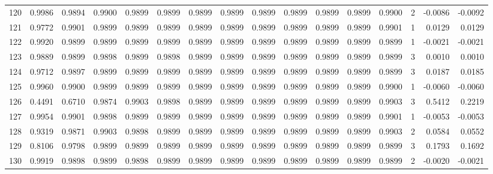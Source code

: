 \begin{tabular}{lrrrrrrrrrrrrrrr}
120 &      0.9986 &  0.9894 &  0.9900 &  0.9899 &  0.9899 &  0.9899 &  0.9899 &  0.9899 &  0.9899 &  0.9899 &   0.9899 &     0.9900 &      2 &                   -0.0086 &                    -0.0092 \\
121 &      0.9772 &  0.9901 &  0.9899 &  0.9899 &  0.9899 &  0.9899 &  0.9899 &  0.9899 &  0.9899 &  0.9899 &   0.9899 &     0.9901 &      1 &                    0.0129 &                     0.0129 \\
122 &      0.9920 &  0.9899 &  0.9899 &  0.9899 &  0.9899 &  0.9899 &  0.9899 &  0.9899 &  0.9899 &  0.9899 &   0.9899 &     0.9899 &      1 &                   -0.0021 &                    -0.0021 \\
123 &      0.9889 &  0.9899 &  0.9898 &  0.9899 &  0.9898 &  0.9899 &  0.9899 &  0.9899 &  0.9899 &  0.9899 &   0.9899 &     0.9899 &      3 &                    0.0010 &                     0.0010 \\
124 &      0.9712 &  0.9897 &  0.9899 &  0.9899 &  0.9899 &  0.9899 &  0.9899 &  0.9899 &  0.9899 &  0.9899 &   0.9899 &     0.9899 &      3 &                    0.0187 &                     0.0185 \\
125 &      0.9960 &  0.9900 &  0.9899 &  0.9899 &  0.9899 &  0.9899 &  0.9899 &  0.9899 &  0.9899 &  0.9899 &   0.9899 &     0.9900 &      1 &                   -0.0060 &                    -0.0060 \\
126 &      0.4491 &  0.6710 &  0.9874 &  0.9903 &  0.9898 &  0.9899 &  0.9899 &  0.9899 &  0.9899 &  0.9899 &   0.9899 &     0.9903 &      3 &                    0.5412 &                     0.2219 \\
127 &      0.9954 &  0.9901 &  0.9898 &  0.9899 &  0.9899 &  0.9899 &  0.9899 &  0.9899 &  0.9899 &  0.9899 &   0.9899 &     0.9901 &      1 &                   -0.0053 &                    -0.0053 \\
128 &      0.9319 &  0.9871 &  0.9903 &  0.9898 &  0.9899 &  0.9899 &  0.9899 &  0.9899 &  0.9899 &  0.9899 &   0.9899 &     0.9903 &      2 &                    0.0584 &                     0.0552 \\
129 &      0.8106 &  0.9798 &  0.9899 &  0.9899 &  0.9899 &  0.9899 &  0.9899 &  0.9899 &  0.9899 &  0.9899 &   0.9899 &     0.9899 &      3 &                    0.1793 &                     0.1692 \\
130 &      0.9919 &  0.9898 &  0.9899 &  0.9898 &  0.9899 &  0.9899 &  0.9899 &  0.9899 &  0.9899 &  0.9899 &   0.9899 &     0.9899 &      2 &                   -0.0020 &                    -0.0021 \\

\end{tabular}
